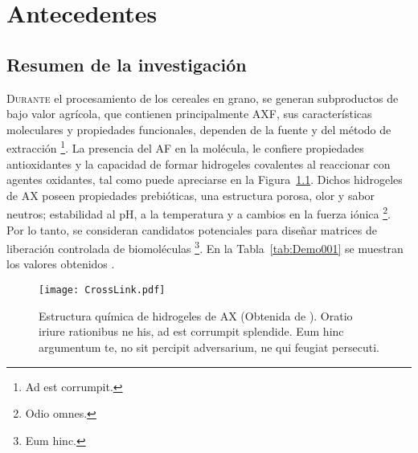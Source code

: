\chapter{Antecedentes}
\section{Resumen de la investigación}
\lettrine{D}{urante} el procesamiento de los cereales en grano, se generan subproductos de bajo valor agrícola, que contienen principalmente \acf{AXF}, sus características moleculares y propiedades funcionales, dependen de la fuente y del método de extracción \footnote{Ad est corrumpit.}. La presencia del \acf{AF} en la molécula, le confiere propiedades antioxidantes y la capacidad de formar hidrogeles covalentes al reaccionar con agentes oxidantes, tal como puede apreciarse en la Figura~\ref{fig:GelificacionAX}. Dichos hidrogeles de \acf{AX} poseen propiedades prebióticas, una estructura porosa, olor y sabor neutros; estabilidad al pH, a la temperatura y a cambios en la fuerza iónica \footnote{Odio omnes.}. Por lo tanto, se consideran candidatos potenciales para diseñar matrices de liberación controlada de biomoléculas \footnote{Eum hinc.}. En la Tabla~\ref{tab:Demo001} se muestran los valores obtenidos \citep{adams2003characterisation}.



\begin{figure}[h] %
    \centering 
	\texttt{[image: CrossLink.pdf]}
    \caption[Estructura química de hidrogeles de AX]%
    {Estructura química de hidrogeles de AX (Obtenida de \citet{andrewartha1979solution}). Oratio iriure rationibus ne his, ad est corrumpit splendide. Eum hinc argumentum te, no sit percipit adversarium, ne qui feugiat persecuti.}
    \label{fig:GelificacionAX}
\end{figure}


